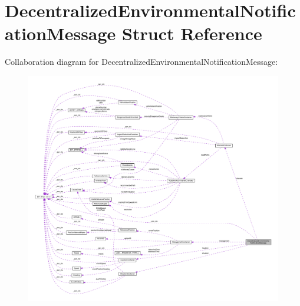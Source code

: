 \hypertarget{structDecentralizedEnvironmentalNotificationMessage}{}\section{Decentralized\+Environmental\+Notification\+Message Struct Reference}
\label{structDecentralizedEnvironmentalNotificationMessage}


Collaboration diagram for Decentralized\+Environmental\+Notification\+Message\+:\nopagebreak
\begin{figure}[H]
\begin{center}
\leavevmode
\includegraphics[width=350pt]{structDecentralizedEnvironmentalNotificationMessage__coll__graph}
\end{center}
\end{figure}
